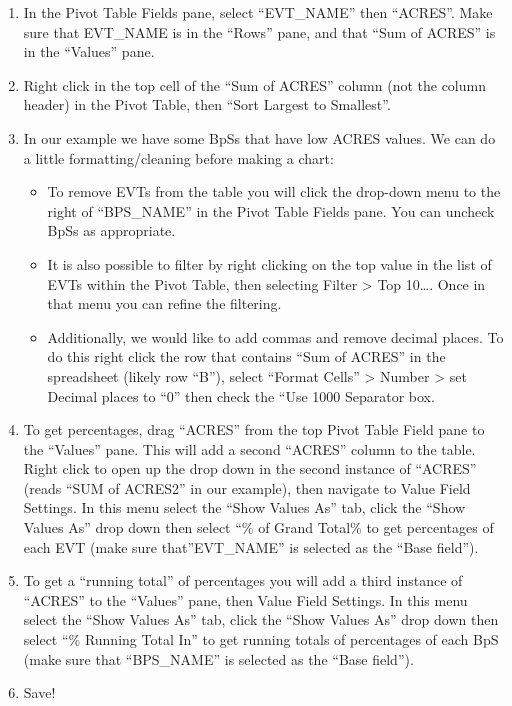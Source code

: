 \documentclass[
]{book}
\providecommand{\tightlist}{%
  \setlength{\itemsep}{0pt}\setlength{\parskip}{0pt}}
\begin{document}
\begin{enumerate}
\def\labelenumi{\arabic{enumi}.}
\tightlist
\item
  In the Pivot Table Fields pane, select ``EVT\_NAME'' then ``ACRES''. Make sure that EVT\_NAME is in the ``Rows'' pane, and that ``Sum of ACRES'' is in the ``Values'' pane.\\
\item
  Right click in the top cell of the ``Sum of ACRES'' column (not the column header) in the Pivot Table, then ``Sort Largest to Smallest''.
\item
  In our example we have some BpSs that have low ACRES values. We can do a little formatting/cleaning before making a chart:

  \begin{itemize}
  \tightlist
  \item
    To remove EVTs from the table you will click the drop-down menu to the right of ``BPS\_NAME'' in the Pivot Table Fields pane. You can uncheck BpSs as appropriate.
  \item
    It is also possible to filter by right clicking on the top value in the list of EVTs within the Pivot Table, then selecting Filter \textgreater{} Top 10\ldots. Once in that menu you can refine the filtering.
  \item
    Additionally, we would like to add commas and remove decimal places. To do this right click the row that contains ``Sum of ACRES'' in the spreadsheet (likely row ``B''), select ``Format Cells'' \textgreater{} Number \textgreater{} set Decimal places to ``0'' then check the ``Use 1000 Separator box.
  \end{itemize}
\item
  To get percentages, drag ``ACRES'' from the top Pivot Table Field pane to the ``Values'' pane. This will add a second ``ACRES'' column to the table. Right click to open up the drop down in the second instance of ``ACRES'' (reads ``SUM of ACRES2'' in our example), then navigate to Value Field Settings. In this menu select the ``Show Values As'' tab, click the ``Show Values As'' drop down then select ``\% of Grand Total\% to get percentages of each EVT (make sure that''EVT\_NAME'' is selected as the ``Base field'').\\
\item
  To get a ``running total'' of percentages you will add a third instance of ``ACRES'' to the ``Values'' pane, then Value Field Settings. In this menu select the ``Show Values As'' tab, click the ``Show Values As'' drop down then select ``\% Running Total In'' to get running totals of percentages of each BpS (make sure that ``BPS\_NAME'' is selected as the ``Base field'').
\item
  Save!
\end{enumerate}
\end{document}

